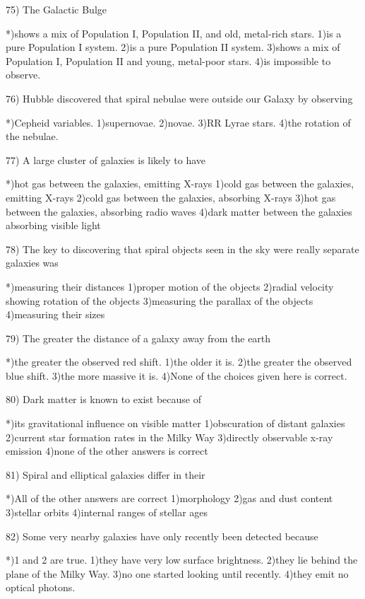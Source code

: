 75) The Galactic Bulge
 
 *)shows a mix of Population I, Population II, and old, metal-rich
   stars.
 1)is a pure Population I system.
 2)is a pure Population II system.
 3)shows a mix of Population I, Population II and young, metal-poor
   stars.
 4)is impossible to observe.
 
76) Hubble discovered that spiral nebulae were outside our Galaxy by
    observing
 
 *)Cepheid variables.
 1)supernovae.
 2)novae.
 3)RR Lyrae stars.
 4)the rotation of the nebulae.
 
77) A large cluster of galaxies is likely to have
 
 *)hot gas between the galaxies, emitting X-rays
 1)cold gas between the galaxies, emitting X-rays
 2)cold gas between the galaxies, absorbing X-rays
 3)hot gas between the galaxies, absorbing radio waves
 4)dark matter between the galaxies absorbing visible light
 
78) The key to discovering that spiral objects seen in the sky were really
    separate galaxies was
 
 *)measuring their distances
 1)proper motion of the objects
 2)radial velocity showing rotation of the objects
 3)measuring the parallax of the objects
 4)measuring their sizes
 
79) The greater the distance of a galaxy away from the earth
 
 *)the greater the observed red shift.
 1)the older it is.
 2)the greater the observed blue shift.
 3)the more massive it is.
 4)None of the choices given here is correct.
 
80) Dark matter is known to exist because of
 
 *)its gravitational influence on visible matter
 1)obscuration of distant galaxies
 2)current star formation rates in the Milky Way
 3)directly observable x-ray emission
 4)none of the other answers is correct
 
81) Spiral and elliptical galaxies differ in their
 
 *)All of the other answers are correct
 1)morphology
 2)gas and dust content
 3)stellar orbits
 4)internal ranges of stellar ages
 
82) Some very nearby galaxies have only recently been detected because
 
 *)1 and 2 are true.
 1)they have very low surface brightness.
 2)they lie behind the plane of the Milky Way.
 3)no one started looking until recently.
 4)they emit no optical photons.
 
